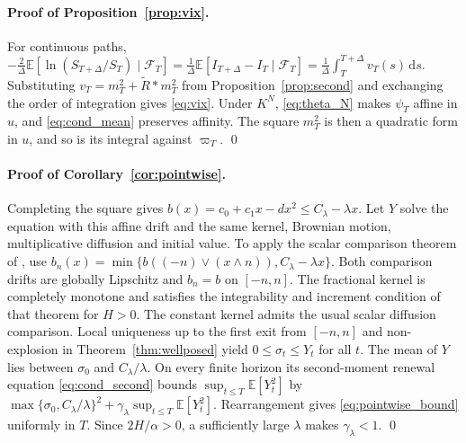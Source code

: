 \documentclass[11pt,a4paper]{article}
\theoremstyle{definition}
\newcommand{\D}{\mathrm{d}}
\newcommand{\E}{\mathbb{E}}
\newcommand{\F}{\mathcal{F}}
\begin{document}
\paragraph{Proof of Proposition~\ref{prop:vix}.} For continuous paths, $-\tfrac2\Delta\E[\ln(S_{T+\Delta}/S_T)\mid\F_T]=\tfrac1\Delta\E[I_{T+\Delta}-I_T\mid\F_T]=\tfrac1\Delta\int_T^{T+\Delta}v_T(s)\,\D s$. Substituting $v_T=m_T^2+\widetilde R*m_T^2$ from Proposition~\ref{prop:second} and exchanging the order of integration gives \eqref{eq:vix}. Under $K^N$, \eqref{eq:theta_N} makes $\psi_T$ affine in $u$, and \eqref{eq:cond_mean} preserves affinity. The square $m_T^2$ is then a quadratic form in $u$, and so is its integral against $\varpi_T$. \qed

\paragraph{Proof of Corollary~\ref{cor:pointwise}.} Completing the square gives $b(x)=c_0+c_1x-dx^2\le C_\lambda-\lambda x$. Let $Y$ solve the equation with this affine drift and the same kernel, Brownian motion, multiplicative diffusion and initial value. To apply the scalar comparison theorem of \citet[Theorem~3.3]{Alfonsi2025}, use $b_n(x)=\min\{b((-n)\vee(x\wedge n)),C_\lambda-\lambda x\}$. Both comparison drifts are globally Lipschitz and $b_n=b$ on $[-n,n]$. The fractional kernel is completely monotone and satisfies the integrability and increment condition of that theorem for $H>0$. The constant kernel admits the usual scalar diffusion comparison. Local uniqueness up to the first exit from $[-n,n]$ and non-explosion in Theorem~\ref{thm:wellposed} yield $0\le\sigma_t\le Y_t$ for all $t$. The mean of $Y$ lies between $\sigma_0$ and $C_\lambda/\lambda$. On every finite horizon its second-moment renewal equation \eqref{eq:cond_second} bounds $\sup_{t\le T}\E[Y_t^2]$ by $\max\{\sigma_0,C_\lambda/\lambda\}^2+\gamma_\lambda\sup_{t\le T}\E[Y_t^2]$. Rearrangement gives \eqref{eq:pointwise_bound} uniformly in $T$. Since $2H/\alpha>0$, a sufficiently large $\lambda$ makes $\gamma_\lambda<1$. \qed
\end{document}

